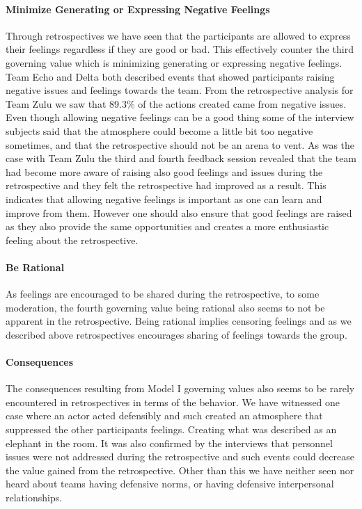 \paragraph{Minimize Generating or Expressing Negative Feelings}
Through retrospectives we have seen that the participants are allowed to express their feelings regardless if they are good or bad. This effectively counter the third governing value which is minimizing generating or expressing negative feelings. Team Echo and Delta both described events that showed participants raising negative issues and feelings towards the team. From the retrospective analysis for Team Zulu we saw that 89.3\% of the actions created came from negative issues. Even though allowing negative feelings can be a good thing some of the interview subjects said that the atmosphere could become a little bit too negative sometimes, and that the retrospective should not be an arena to vent. As was the case with Team Zulu the third and fourth feedback session revealed that the team had become more aware of raising also good feelings and issues during the retrospective and they felt the retrospective had improved as a result. This indicates that allowing negative feelings is important as one can learn and improve from them. However one should also ensure that good feelings are raised as they also provide the same opportunities and creates a more enthusiastic feeling about the retrospective.

\paragraph{Be Rational}
As feelings are encouraged to be shared during the retrospective, to some moderation, the fourth governing value being rational also seems to not be apparent in the retrospective. Being rational implies censoring feelings and as we described above retrospectives encourages sharing of feelings towards the group. 

\paragraph{Consequences}
The consequences resulting from Model I governing values also seems to be rarely encountered in retrospectives in terms of the behavior. We have witnessed one case where an actor acted defensibly and such created an atmosphere that suppressed the other participants feelings. Creating what was described as an elephant in the room. It was also confirmed by the interviews that personnel issues were not addressed during the retrospective and such events could decrease the value gained from the retrospective. Other than this we have neither seen nor heard about teams having defensive norms, or having defensive interpersonal relationships. 

